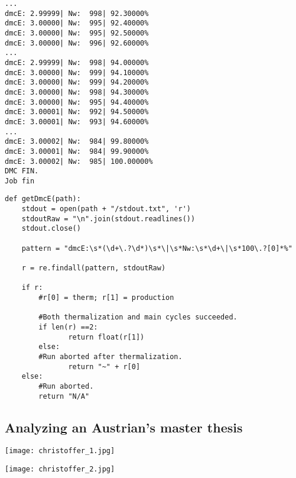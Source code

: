 \documentclass{beamer}
\begin{document}
\begin{frame}[containsverbatim]
\scriptsize
\begin{verbatim}
...
dmcE: 2.99999| Nw:  998| 92.30000%
dmcE: 3.00000| Nw:  995| 92.40000%
dmcE: 3.00000| Nw:  995| 92.50000%
dmcE: 3.00000| Nw:  996| 92.60000%
...
dmcE: 2.99999| Nw:  998| 94.00000%
dmcE: 3.00000| Nw:  999| 94.10000%
dmcE: 3.00000| Nw:  999| 94.20000%
dmcE: 3.00000| Nw:  998| 94.30000%
dmcE: 3.00000| Nw:  995| 94.40000%
dmcE: 3.00001| Nw:  992| 94.50000%
dmcE: 3.00001| Nw:  993| 94.60000%
...
dmcE: 3.00002| Nw:  984| 99.80000%
dmcE: 3.00001| Nw:  984| 99.90000%
dmcE: 3.00002| Nw:  985| 100.00000%
DMC FIN.
Job fin
\end{verbatim}
\normalsize
\end{frame}

\begin{frame}[containsverbatim]
\scriptsize
\begin{verbatim}
def getDmcE(path):
    stdout = open(path + "/stdout.txt", 'r')
    stdoutRaw = "\n".join(stdout.readlines())
    stdout.close()
    
    pattern = "dmcE:\s*(\d+\.?\d*)\s*\|\s*Nw:\s*\d+\|\s*100\.?[0]*%"
    
    r = re.findall(pattern, stdoutRaw)
    
    if r:
        #r[0] = therm; r[1] = production

        #Both thermalization and main cycles succeeded.
        if len(r) ==2:
               return float(r[1])
        else:
        #Run aborted after thermalization.
               return "~" + r[0]
    else:
        #Run aborted.
        return "N/A"
\end{verbatim}
\normalsize
\end{frame}


\subsection{Analyzing an Austrian's master thesis}

\begin{frame}
\begin{center}
 \texttt{[image: christoffer\_1.jpg]}
\end{center}
\end{frame}

\begin{frame}
\begin{center}
 \texttt{[image: christoffer\_2.jpg]}
\end{center}
\end{frame}
\end{document}
